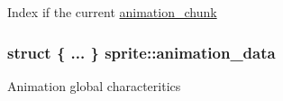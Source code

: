 Index if the current \hyperlink{structanimation__chunk}{animation\_\-chunk} \hypertarget{structsprite_86c7732d824f595ebbb85461e5230485}{
\subsubsection{\setlength{\rightskip}{0pt plus 5cm}struct \{ ... \}   {\bf sprite::animation\_\-data}}}
\label{structsprite_86c7732d824f595ebbb85461e5230485}


Animation global characteritics 